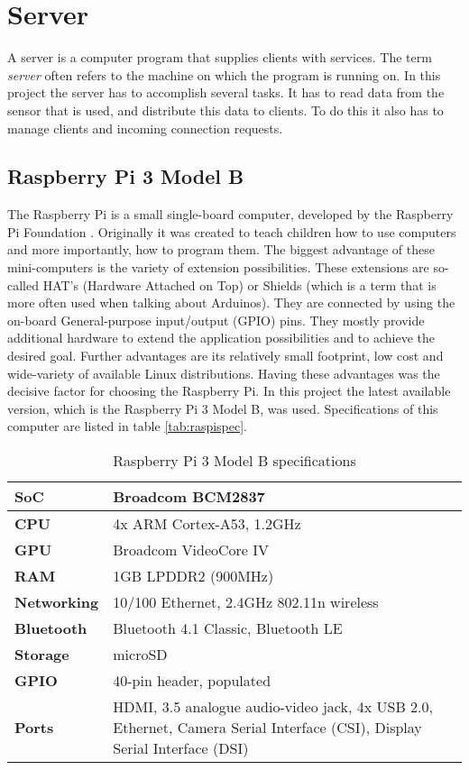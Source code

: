 \chapter{Server}
\label{ch:server}

\author{Nico Kratky}
%
A server is a computer program that supplies clients with services. The term \textit{server} often refers to the machine on which the program is running on. In this project the server has to accomplish several tasks. It has to read data from the sensor that is used, and distribute this data to clients. To do this it also has to manage clients and incoming connection requests.

\section{Raspberry Pi 3 Model B}

The Raspberry Pi is a small single-board computer, developed by the Raspberry Pi Foundation \autocite{RasPi}. Originally it was created to teach children how to use computers and more importantly, how to program them. The biggest advantage of these mini-computers is the variety of extension possibilities. These extensions are so-called HAT's (Hardware Attached on Top) or Shields (which is a term that is more often used when talking about Arduinos). They are connected by using the on-board General-purpose input/output (GPIO) pins. They mostly provide additional hardware to extend the application possibilities and to achieve the desired goal. Further advantages are its relatively small footprint, low cost and wide-variety of available Linux distributions. Having these advantages was the decisive factor for choosing the Raspberry Pi. In this project the latest available version, which is the Raspberry Pi 3 Model B, was used. Specifications of this computer are listed in table \vref{tab:raspispec}.

\begin{table}[h]
    \centering
    \begin{tabularx}{\linewidth}{| l | X |}
    \hline
    \textbf{SoC} & Broadcom BCM2837 \\ \hline
    \textbf{CPU} & 4x ARM Cortex-A53, 1.2GHz \\ \hline
    \textbf{GPU} & Broadcom VideoCore IV \\ \hline
    \textbf{RAM} & 1GB LPDDR2 (900MHz) \\ \hline
    \textbf{Networking} & 10/100 Ethernet, 2.4GHz 802.11n wireless \\ \hline
    \textbf{Bluetooth} & Bluetooth 4.1 Classic, Bluetooth LE \\ \hline
    \textbf{Storage} & microSD \\ \hline
    \textbf{GPIO} & 40-pin header, populated \\ \hline
    \textbf{Ports} & HDMI, 3.5 analogue audio-video jack, 4x USB 2.0, Ethernet, Camera Serial Interface (CSI), Display Serial Interface (DSI) \\ \hline
    \end{tabularx}
    \caption{Raspberry Pi 3 Model B specifications}
    \label{tab:raspispec}
\end{table}

